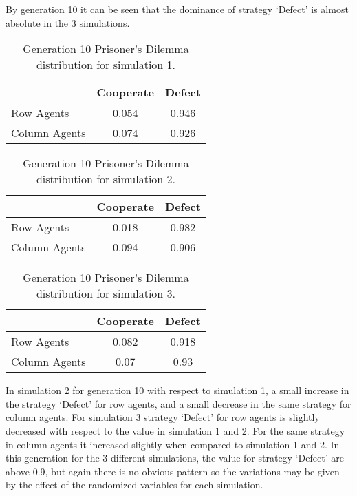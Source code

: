 \documentclass{book}
\begin{document}
By generation 10 it can be seen that the dominance of strategy `Defect'  is almost absolute in the 3 simulations.
\begin{table}[H]
\begin{center}
\begin{tabular}{|l|c|c|}
\hline
& Cooperate & Defect \\ 
\hline
Row Agents & 0.054 & 0.946\\
\hline
Column Agents & 0.074 & 0.926\\
\hline
\end{tabular}
\end{center}
\caption{Generation 10 Prisoner’s Dilemma distribution for simulation 1.}
\label{tab:pds1g10}
\end{table}

\begin{table}[H]
\begin{center}
\begin{tabular}{|l|c|c|}
\hline
& Cooperate & Defect \\ 
\hline
Row Agents & 0.018 & 0.982\\
\hline
Column Agents & 0.094 & 0.906\\
\hline
\end{tabular}
\end{center}
\caption{Generation 10 Prisoner’s Dilemma distribution for simulation 2.}
\label{tab:pds2g10}
\end{table}

\begin{table}[H]
\begin{center}
\begin{tabular}{|l|c|c|}
\hline
& Cooperate & Defect \\ 
\hline
Row Agents & 0.082 & 0.918\\
\hline
Column Agents & 0.07 & 0.93\\
\hline
\end{tabular}
\end{center}
\caption{Generation 10 Prisoner’s Dilemma distribution for simulation 3.}
\label{tab:pds3g10}
\end{table}

In simulation 2 for generation 10  with respect to simulation 1, a small increase in the strategy `Defect'  for row agents, and a small decrease in the same strategy for column agents. For simulation 3 strategy `Defect' for row agents is slightly decreased with respect to the value in simulation 1 and 2. For the same strategy in column agents it increased slightly when compared to simulation 1 and 2.
In this generation for the 3 different simulations, the value for strategy `Defect' are above 0.9, but again there is no obvious pattern so the variations may be given by the effect of the randomized variables for each simulation.
\end{document}

